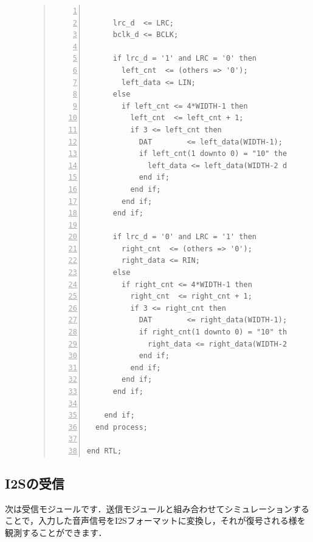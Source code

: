 \documentclass[a4paper,dvipdfmx]{jsarticle}
\begin{document}
\begin{figure}[H]
\begin{quote}
\begin{Verbatim}[frame=single, numbers=left, baselinestretch=0.8]
      
      lrc_d  <= LRC;
      bclk_d <= BCLK;
      
      if lrc_d = '1' and LRC = '0' then
        left_cnt  <= (others => '0');
        left_data <= LIN;
      else
        if left_cnt <= 4*WIDTH-1 then
          left_cnt  <= left_cnt + 1;
          if 3 <= left_cnt then
            DAT        <= left_data(WIDTH-1);
            if left_cnt(1 downto 0) = "10" then
              left_data <= left_data(WIDTH-2 downto 0) & '0';
            end if;
          end if;
        end if;
      end if;
      
      if lrc_d = '0' and LRC = '1' then
        right_cnt  <= (others => '0');
        right_data <= RIN;
      else
        if right_cnt <= 4*WIDTH-1 then
          right_cnt  <= right_cnt + 1;
          if 3 <= right_cnt then
            DAT        <= right_data(WIDTH-1);
            if right_cnt(1 downto 0) = "10" then
              right_data <= right_data(WIDTH-2 downto 0) & '0';
            end if;
          end if;
        end if;
      end if;
      
    end if;
  end process;

end RTL;
\end{Verbatim}
\end{quote}
\end{figure}

\subsection{I2Sの受信}
次は受信モジュールです．送信モジュールと組み合わせてシミュレーションすることで，入力した音声信号をI2Sフォーマットに変換し，それが復号される様を観測することができます．
\end{document}
